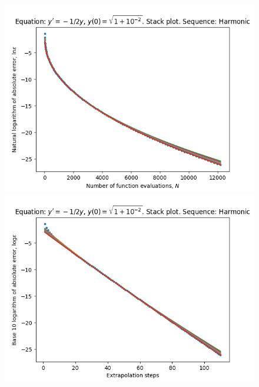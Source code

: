 \begin{figure}[H]
\centering
\begin{minipage}{0.45\textwidth}
\centering
\includegraphics[scale=0.45]{emr_plots/quad_sing_2_hp_harmonic_stack.png}
\end{minipage}
\begin{minipage}{0.45\textwidth}
\centering
\includegraphics[scale=0.45]{emr_plots/quad_sing_2_hp_harmonic_steps_stack.png}
\end{minipage}
\end{figure}

